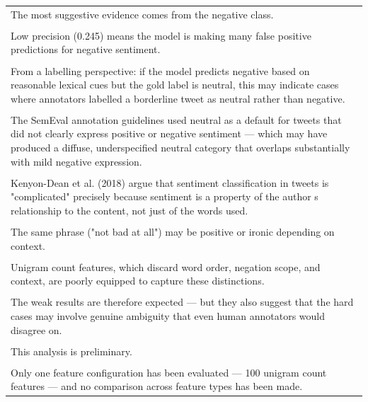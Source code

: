 \documentclass[11pt]{article}
\begin{document}
\begin{longtable}{|p{\dimexpr\linewidth-2\tabcolsep-2\arrayrulewidth\relax}|}
\hline
\rule{0pt}{3.5cm} \\
\hline
The most suggestive evidence comes from the negative class. \\[2pt]
\hline
\rule{0pt}{3.5cm} \\
\hline
Low precision (0.245) means the model is making many false positive predictions for negative sentiment. \\[2pt]
\hline
\rule{0pt}{3.5cm} \\
\hline
From a labelling perspective: if the model predicts negative based on reasonable lexical cues but the gold label is neutral, this may indicate cases where annotators labelled a borderline tweet as neutral rather than negative. \\[2pt]
\hline
\rule{0pt}{3.5cm} \\
\hline
The SemEval annotation guidelines used neutral as a default for tweets that did not clearly express positive or negative sentiment --- which may have produced a diffuse, underspecified neutral category that overlaps substantially with mild negative expression. \\[2pt]
\hline
\rule{0pt}{3.5cm} \\
\hline
Kenyon-Dean et al. (2018) argue that sentiment classification in tweets is "complicated" precisely because sentiment is a property of the author s relationship to the content, not just of the words used. \\[2pt]
\hline
\rule{0pt}{3.5cm} \\
\hline
The same phrase ("not bad at all") may be positive or ironic depending on context. \\[2pt]
\hline
\rule{0pt}{3.5cm} \\
\hline
Unigram count features, which discard word order, negation scope, and context, are poorly equipped to capture these distinctions. \\[2pt]
\hline
\rule{0pt}{3.5cm} \\
\hline
The weak results are therefore expected --- but they also suggest that the hard cases may involve genuine ambiguity that even human annotators would disagree on. \\[2pt]
\hline
\rule{0pt}{3.5cm} \\
\hline
This analysis is preliminary. \\[2pt]
\hline
\rule{0pt}{3.5cm} \\
\hline
Only one feature configuration has been evaluated --- 100 unigram count features --- and no comparison across feature types has been made. \\[2pt]

\end{longtable}
\end{document}
